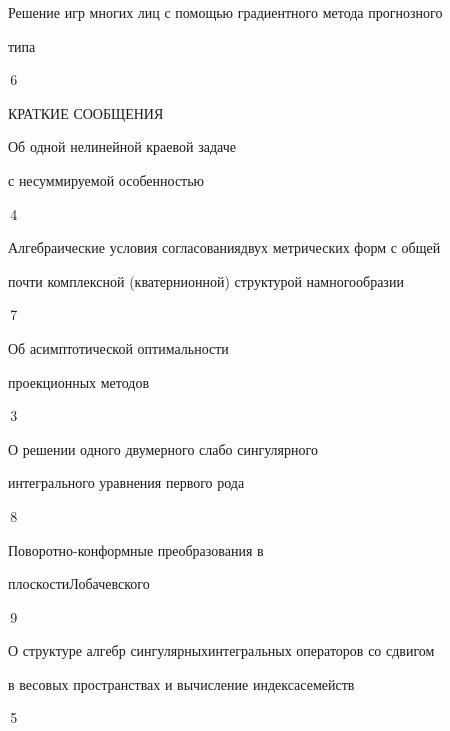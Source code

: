 

{Решение игр многих лиц с помощью градиентного метода прогнозного \newline


типа}{\No\,6}








\bigskip


{\centerline {КРАТКИЕ СООБЩЕНИЯ}}


\bigskip













{Об одной нелинейной краевой задаче


с несуммируемой особенностью}{\No\,4}




{Алгебраические условия согласования\newline двух метрических форм с общей


почти комплексной (кватернионной) структурой на\newline многообразии}{\No\,7}




{Об асимптотической оптимальности 


проекционных методов}{\No\,3}




{О решении одного двумерного слабо сингулярного \newline


интегрального уравнения первого рода}{\No\,8}




{Поворотно-конформные преобразования в  


плоскости\newline Лобачевского}{\No\,9}




{О структуре алгебр сингулярных\newline интегральных операторов со сдвигом


в весовых пространствах и вычисление индекса\newline семейств}{\No\,5}




